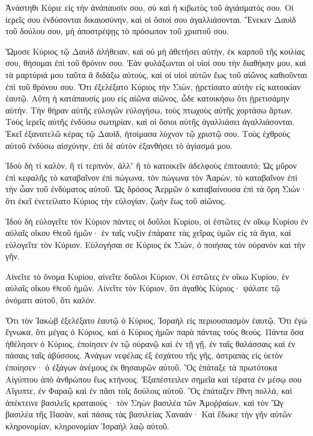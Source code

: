 \begin{spacing}{1.1}
\begin{multicols}{2}
Ἀνάστηθι Κύριε εἰς τὴν ἀνάπαυσίν σου, σὺ καὶ ἡ κιβωτὸς τοῦ ἁγιάσματός σου.
Οἱ ἱερεῖς σου ἐνδύσονται δικαιοσύνην, καὶ οἱ ὅσιοί σου ἀγαλλιάσονται.
Ἕνεκεν Δαυὶδ τοῦ δούλου σου, μὴ ἀποστρέψῃς τὸ πρόσωπον τοῦ χριστοῦ σου.

Ὤμοσε Κύριος τῷ Δαυὶδ ἀλήθειαν, καὶ οὐ μὴ ἀθετήσει αὐτὴν, ἐκ καρποῦ τῆς κοιλίας σου, θήσομαι ἐπὶ τοῦ θρόνον σου.
Ἐὰν φυλάξωνται οἱ υἱοί σου τὴν διαθήκην μου, καὶ τὰ μαρτύριά μου ταῦτα ἃ διδάξω αὐτοὺς, καὶ οἱ υἱοὶ αὐτῶν ἕως τοῦ αἰῶνος καθιοῦνται ἐπὶ τοῦ θρόνου σου.
Ὅτι ἐξελέξατο Κύριος τὴν Σιὼν, ᾑρετίσατο αὐτὴν εἰς κατοικίαν ἑαυτῷ.
Αὕτη ἡ κατάπαυσίς μου εἰς αἰῶνα αἰῶνος, ὧδε κατοικήσω ὅτι ᾑρετισάμην αὐτήν.
Τὴν θήραν αὐτῆς εὐλογῶν εὐλογήσω, τοὺς πτωχοὺς αὐτῆς χορτάσω ἄρτων.
Τοὺς ἱερεῖς αὐτῆς ἐνδύσω σωτηρίαν, καὶ οἱ ὅσιοι αὐτῆς ἀγαλλιάσει ἀγαλλιάσονται.
Ἐκεῖ ἐξανατελῶ κέρας τῷ Δαυὶδ, ἡτοίμασα λύχνον τῷ χριστῷ σου.
Τοὺς ἐχθροὺς αὐτοῦ ἐνδύσω αἰσχύνην, ἐπὶ δὲ αὐτὸν ἐξανθήσει τὸ ἁγίασμά μου.

Ἰδοὺ δὴ τί καλὸν, ἢ τί τερπνὸν, ἀλλʼ ἢ τὸ κατοικεῖν ἀδελφοὺς ἐπιτοαυτό;
Ὡς μῦρον ἐπὶ κεφαλῆς τὸ καταβαῖνον ἐπὶ πώγωνα, τὸν πώγωνα τὸν Ἀαρὼν, τὸ καταβαῖνον ἐπὶ τὴν ὦαν τοῦ ἐνδύματος αὐτοῦ.
Ὡς δρόσος Ἀερμῶν ὁ καταβαίνουσα ἐπὶ τὰ ὄρη Σιών· ὅτι ἐκεῖ ἐνετείλατο Κύριος τὴν εὐλογίαν, ζωὴν ἕως τοῦ αἰῶνος.

Ἰδοὺ δὴ εὐλογεῖτε τὸν Κύριον πάντες οἱ δοῦλοι Κυρίου, οἱ ἑστῶτες ἐν οἴκῳ Κυρίου ἐν αὐλαῖς οἴκου Θεοῦ ἡμῶν·
ἐν ταῖς νυξὶν ἐπάρατε τὰς χεῖρας ὑμῶν εἰς τὰ ἅγια, καὶ εὐλογεῖτε τὸν Κύριον.
Εὐλογήσαι σε Κύριος ἐκ Σιὼν, ὁ ποιήσας τὸν οὐρανὸν καὶ τὴν γῆν.

Αἰνεῖτε τὸ ὄνομα Κυρίου, αἰνεῖτε δοῦλοι Κύριον,
Οἱ ἑστῶτες ἐν οἴκω Κυρίου, ἐν αὐλαῖς οἴκου Θεοῦ ἡμῶν.
Αἰνεῖτε τὸν Κύριον, ὅτι ἀγαθὸς Κύριος· ψάλατε τῷ ὀνόματι αὐτοῦ, ὅτι καλόν.

Ὅτι τὸν Ἰακὼβ ἐξελέξατο ἑαυτῷ ὁ Κύριος, Ἰσραὴλ εἰς περιουσιασμὸν ἑαυτῷ.
Ὅτι ἐγὼ ἔγνωκα, ὅτι μέγας ὁ Κύριος, καὶ ὁ Κύριος ἡμῶν παρὰ πάντας τοὺς θεούς.
Πάντα ὅσα ἠθέλησεν ὁ Κύριος, ἐποίησεν ἐν τῷ οὐρανῷ καὶ ἐν τῇ γῇ, ἐν ταῖς θαλάσσαις καὶ ἐν πάσαις ταῖς ἀβύσσοις.
Ἀνάγων νεφέλας ἐξ ἐσχάτου τῆς γῆς, ἀστραπὰς εἰς ὑετὸν ἐποίησεν· ὁ ἐξάγων ἀνέμους ἐκ θησαυρῶν αὐτοῦ.
Ὃς ἐπάταξε τὰ πρωτότοκα Αἰγύπτου ἀπὸ ἀνθρώπου ἕως κτήνους.
Ἐξαπέστειλεν σημεῖα καὶ τέρατα ἐν μέσῳ σου Αἴγυπτε, ἐν Φαραῷ καὶ ἐν πᾶσι τοῖς δούλοις αὐτοῦ.
Ὃς ἐπάταξεν ἔθνη πολλά, καὶ ἀπέκτεινε βασιλεῖς κραταιούς·
τὸν Σηὼν βασιλέα τῶν Ἀμοῤῥαίων, καὶ τὸν Ὢγ βασιλέα τῆς Βασὰν, καὶ πάσας τὰς βασιλείας Χαναάν·
Καὶ ἔδωκε τὴν γῆν αὐτῶν κληρονομίαν, κληρονομίαν Ἰσραὴλ λαῷ αὐτοῦ.


\end{multicols}
\end{spacing}
